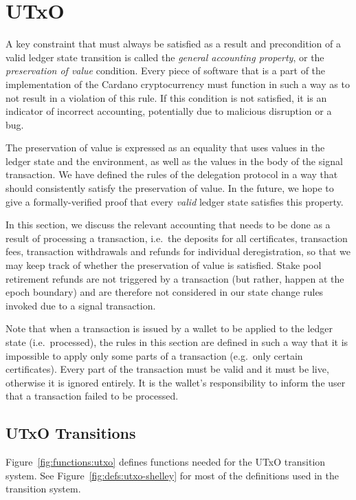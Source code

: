 \section{UTxO}
\label{sec:utxo}

A key constraint that must always be satisfied as a result and precondition of
a valid ledger state transition is called the \textit{general accounting
property}, or the \textit{preservation of value} condition. Every piece of
software that is a part of the implementation of the
Cardano cryptocurrency must function in such a way as to not result in
a violation of this rule.
If this condition is not satisfied, it is an indicator of
incorrect accounting, potentially due to
malicious disruption or a bug.

The preservation of value is expressed as an equality that uses values in
the ledger state and the environment, as well as the values in the body of
the signal transaction.
We have defined the rules of the delegation protocol in a way that should
consistently satisfy the preservation of value. In the future, we hope to
give a formally-verified proof that every \textit{valid} ledger state satisfies
this property.

In this section, we discuss the relevant accounting that needs to be done
as a result of processing a transaction, i.e.~the deposits for all certificates,
transaction fees, transaction withdrawals and refunds for individual
deregistration, so that we may keep track of whether the preservation of
value is satisfied. Stake pool retirement refunds are not triggered by a
transaction (but rather, happen at the epoch boundary) and are therefore
not considered in our state change rules invoked due to a signal transaction.

Note that when a transaction is issued by a wallet to be applied to the ledger
state (i.e.~processed), the rules in this section are defined in such a way that it is impossible to
apply only some parts of a transaction (e.g.~only certain certificates).
Every part of the transaction must be valid and it must be live, otherwise
it is ignored entirely. It is the wallet's responsibility to inform the user
that a transaction failed to be processed.

\subsection{UTxO Transitions}
\label{sec:utxo-trans}

Figure~\ref{fig:functions:utxo} defines functions needed for the UTxO transition system.
See Figure~\ref{fig:defs:utxo-shelley} for most of the definitions used in the transition system.

